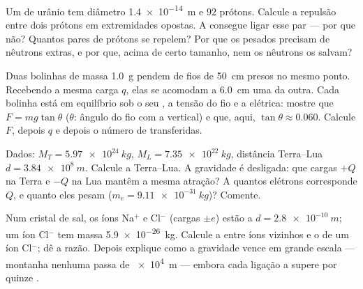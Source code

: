 \begin{exercise}[$\star\star\star$]\label{exo:g11:fundamental-interactions:12}
Um  de urânio tem diâmetro \qty{1.4e-14}{m} e $92$ prótons.
Calcule a repulsão entre dois prótons em extremidades opostas. A
 consegue ligar esse par --- por que não? Quantos pares de
prótons se repelem? Por que os  pesados precisam de nêutrons
extras, e por que, acima de certo tamanho, nem os nêutrons os salvam?
\end{exercise}

\begin{exercise}[$\star\star\star$]\label{exo:g11:fundamental-interactions:13}
Duas bolinhas de massa \qty{1.0}{g} pendem de fios de \qty{50}{cm}
presos no mesmo ponto. Recebendo a mesma carga $q$, elas se acomodam a
\qty{6.0}{cm} uma da outra. Cada bolinha está em equilíbrio sob o seu
, a tensão do fio e a  elétrica: mostre que
$F = mg\tan\theta$ ($\theta$: ângulo do fio com a vertical) e que, aqui,
$\tan\theta \approx 0.060$. Calcule $F$, depois $q$ e depois o número de
 transferidas.
\end{exercise}

\begin{exercise}[$\star\star\star$]\label{exo:g11:fundamental-interactions:14}
Dados: $M_T = \qty{5.97e24}{kg}$, $M_L = \qty{7.35e22}{kg}$, distância
Terra--Lua $d = \qty{3.84e8}{m}$. Calcule a 
Terra--Lua. A gravidade é desligada: que cargas $+Q$ na Terra e $-Q$ na
Lua mantêm a mesma atração? A quantos elétrons corresponde $Q$, e quanto
eles pesam ($m_e = \qty{9.11e-31}{kg}$)? Comente.
\end{exercise}

\begin{exercise}[$\star\star\star$]\label{exo:g11:fundamental-interactions:15}
Num cristal de sal, os íons Na$^{+}$ e Cl$^{-}$ (cargas $\pm e$) estão a
$d = \qty{2.8e-10}{m}$; um íon Cl$^{-}$ tem massa \qty{5.9e-26}{kg}.
Calcule a  entre íons vizinhos e o  de um íon Cl$^{-}$; dê a
razão. Depois explique como a gravidade vence em grande escala ---
montanha nenhuma passa de \qty{e4}{m} --- embora cada ligação a supere
por quinze .
\end{exercise}

